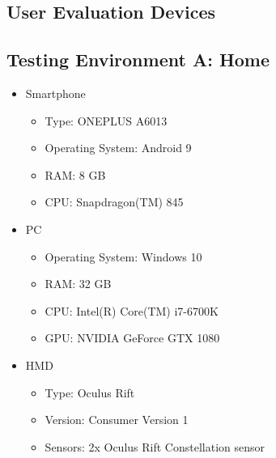 
\begin{appendices}
  \chapter{User Evaluation Devices}\label{chapter:append-user-eval-devices}
  \section{Testing Environment A: Home}
  \begin{itemize}
    \item Smartphone
    \begin{itemize}
      \item Type: ONEPLUS A6013
      \item Operating System: Android 9
      \item RAM: 8 GB
      \item CPU: Snapdragon(TM) 845 %
    \end{itemize}
    \item \ac{PC}
    \begin{itemize}
      \item Operating System: Windows 10
      \item RAM: 32 GB
      \item CPU: Intel(R) Core(TM) i7-6700K %
      \item GPU: NVIDIA GeForce GTX 1080  
    \end{itemize}
    \item \ac{HMD}
    \begin{itemize}
      \item Type: Oculus Rift
      \item Version: Consumer Version 1
      \item Sensors: 2x Oculus Rift Constellation sensor
    \end{itemize}
  \end{itemize}


\end{appendices}
